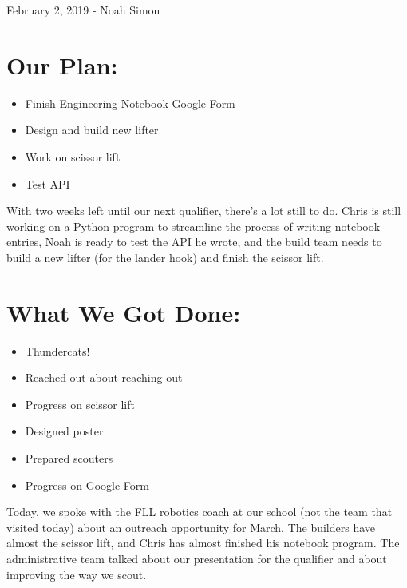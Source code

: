 \documentclass[12pt]{article}
\begin{document}
February 2, 2019 - Noah Simon

\section{Our Plan:} %
\begin{itemize}
	\item Finish Engineering Notebook Google Form
	\item Design and build new lifter
	\item Work on scissor lift
	\item Test API
\end{itemize}

With two weeks left until our next qualifier, there's a lot still to do. Chris is still working on a Python program to streamline the process of writing notebook entries, Noah is ready to test the API he wrote, and the build team needs to build a new lifter (for the lander hook) and finish the scissor lift.

\section{What We Got Done:} %
\begin{itemize}
	\item Thundercats!
	\item Reached out about reaching out
	\item Progress on scissor lift
	\item Designed poster
	\item Prepared scouters
	\item Progress on Google Form
\end{itemize}

Today, we spoke with the FLL robotics coach at our school (not the team that visited today) about an outreach opportunity for March. The builders have almost the scissor lift, and Chris has almost finished his notebook program. The administrative team talked about our presentation for the qualifier and about improving the way we scout.
\end{document}
